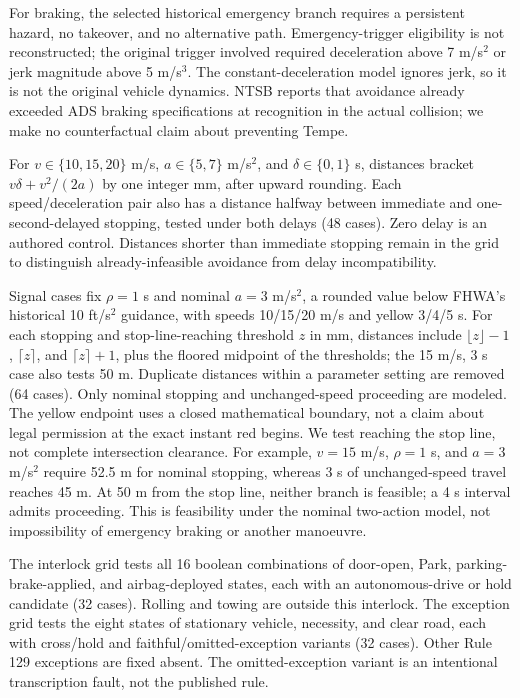 \documentclass[10pt]{article}
\begin{document}
For braking, the selected historical emergency branch requires a persistent
hazard, no takeover, and no alternative path. Emergency-trigger eligibility
is not reconstructed; the original trigger involved required deceleration
above 7 m/s$^2$ or jerk magnitude above 5 m/s$^3$. The constant-deceleration
model ignores jerk, so it is not the original vehicle dynamics. NTSB
reports that avoidance already exceeded ADS braking specifications at
recognition in the actual collision; we make no counterfactual claim about
preventing Tempe.

For $v\in\{10,15,20\}$ m/s, $a\in\{5,7\}$ m/s$^2$, and
$\delta\in\{0,1\}$ s, distances bracket $v\delta+v^2/(2a)$ by one integer mm,
after upward rounding. Each speed/deceleration pair also has a distance
halfway between immediate and one-second-delayed stopping, tested under
both delays (48 cases). Zero delay is an authored control. Distances shorter
than immediate stopping remain in the grid to distinguish already-infeasible
avoidance from delay incompatibility.

Signal cases fix $\rho=1$ s and nominal $a=3$ m/s$^2$, a rounded value below
FHWA's historical 10 ft/s$^2$ guidance, with speeds 10/15/20 m/s and yellow
3/4/5 s. For each stopping and stop-line-reaching threshold $z$ in mm,
distances include $\lfloor z\rfloor-1$, $\lceil z\rceil$, and
$\lceil z\rceil+1$, plus the floored midpoint of the thresholds; the
15 m/s, 3 s case also tests 50 m. Duplicate distances within a parameter
setting are removed (64 cases). Only nominal stopping and unchanged-speed
proceeding are modeled. The yellow endpoint uses a closed mathematical
boundary, not a claim about legal permission at the exact instant red begins.
We test reaching the stop line, not complete intersection clearance.
For example, $v=15$ m/s, $\rho=1$ s, and $a=3$ m/s$^2$ require 52.5 m for
nominal stopping, whereas 3 s of unchanged-speed travel reaches 45 m. At
50 m from the stop line, neither branch is feasible; a 4 s interval admits
proceeding. This is feasibility under the nominal two-action model, not
impossibility of emergency braking or another manoeuvre.

The interlock grid tests all 16 boolean combinations of door-open, Park,
parking-brake-applied, and airbag-deployed states, each with an autonomous-drive
or hold candidate (32 cases). Rolling and towing are outside this interlock.
The exception grid tests the eight states of stationary vehicle, necessity,
and clear road, each with cross/hold and faithful/omitted-exception variants
(32 cases). Other Rule 129 exceptions are fixed absent. The omitted-exception
variant is an intentional transcription fault, not the published rule.
\end{document}
